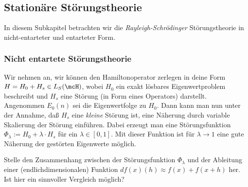 \documentclass{subfile}
\begin{document}
    \subsection{Stationäre Störungstheorie}
        In diesem Subkapitel betrachten wir die \emph{Rayleigh-Schrödinger} Störungstheorie in nicht-entarteter und entarteter Form. 
        \subsubsection*{Nicht entartete Störungstheorie}
            Wir nehmen an, wir können den Hamiltonoperator zerlegen in deine Form $H = H_0 + H_s \in L_S(\mcH)$, wobei $H_0$ ein exakt lösbares Eigenwertproblem beschreibt und $H_s$ eine Störung (in Form eines Operators) darstellt. Angenommen $E_0(n)$ sei die Eigenwertfolge zu $H_0$. Dann kann man nun unter der Annahme, daß $H_s$ eine \emph{kleine} Störung ist, eine Näherung durch variable Skalierung der Störung einführen. Dabei erzeugt man eine Störungsfunktion $\Phi_\lambda := H_0 + \lambda\cdot H_s$ für ein $\lambda\in[0,1]$. Mit dieser Funktion ist für $\lambda\to 1$ eine gute Näherung der gestörten Eigenwerte möglich. 
            
            \begin{Aufgabe}
                \nr{} Stelle den Zusammenhang zwischen der Störungsfunktion $\Phi_\lambda$ und der Ableitung einer (endlichdimensionalen) Funktion $df(x)(h) \approx f(x) + f(x + h)$ her. Ist hier ein sinnvoller Vergleich möglich?
            \end{Aufgabe}
\end{document}
